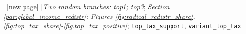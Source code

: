 \begin{enumerate}[resume]
  ~[new page] [\textit{Two random branches: top1; top3}; \textit{Section \ref{par:global_income_redistr}; Figures \ref{fig:radical_redistr_share}, \ref{fig:top_tax_share}-\ref{fig:top_tax_positive}}; 
\verb|top_tax_support|, \verb|variant_top_tax|]

\end{enumerate}
